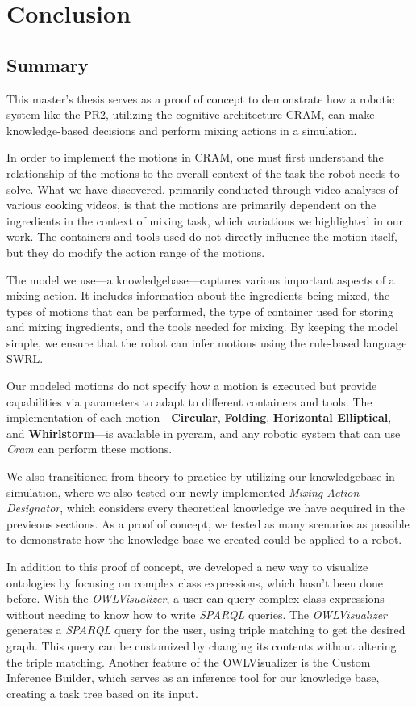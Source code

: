 \chapter{Conclusion}
\label{chap:conclusion}

\section{Summary}
This master's thesis serves as a proof of concept to demonstrate how a robotic system like the PR2, utilizing the cognitive architecture CRAM, can make knowledge-based decisions and perform mixing actions in a simulation.

In order to implement the motions in CRAM, one must first understand the relationship of the motions to the overall context of the task the robot needs to solve. What we have discovered, primarily conducted through video analyses of various cooking videos, is that the motions are primarily dependent on the ingredients in the context of mixing task, which variations we highlighted in our work. The containers and tools used do not directly influence the motion itself, but they do modify the action range of the motions.

The model we use—a knowledgebase—captures various important aspects of a mixing action. It includes information about the ingredients being mixed, the types of motions that can be performed, the type of container used for storing and mixing ingredients, and the tools needed for mixing. By keeping the model simple, we ensure that the robot can infer motions using the rule-based language SWRL.

Our modeled motions do not specify how a motion is executed but provide capabilities via parameters to adapt to different containers and tools. The implementation of each motion—\textbf{Circular}, \textbf{Folding}, \textbf{Horizontal Elliptical}, and \textbf{Whirlstorm}—is available in pycram, and any robotic system that can use \textit{Cram} can perform these motions.

We also transitioned from theory to practice by utilizing our knowledgebase in simulation, where we also tested our newly implemented \textit{Mixing Action Designator}, which considers every theoretical knowledge we have acquired in the previeous sections. As a proof of concept, we tested as many scenarios as possible to demonstrate how the knowledge base we created could be applied to a robot.

In addition to this proof of concept, we developed a new way to visualize ontologies by focusing on complex class expressions, which hasn't been done before. 
With the \textit{OWLVisualizer}, a user can query complex class expressions without needing to know how to write \textit{SPARQL} queries. 
The \textit{OWLVisualizer} generates a \textit{SPARQL} query for the user, using triple matching to get the desired graph. 
This query can be customized by changing its contents without altering the triple matching. Another feature of the OWLVisualizer is the Custom Inference Builder, which serves as an inference tool for our knowledge base, creating a task tree based on its input.
